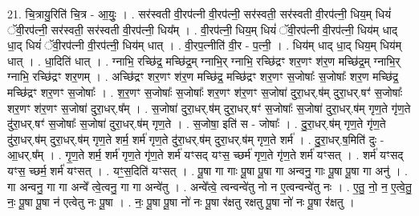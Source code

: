 \documentclass[17pt]{extarticle}
\begin{document}
21. चि॒त्रायु॒रिति॑ चि॒त्र - आ॒युः॒ । . सर॑स्वती वी॒रप॑त्नी वी॒रप॑त्नी॒ सर॑स्वती॒ सर॑स्वती वी॒रप॑त्नी॒ धिय॒म् धियं॑ ॅवी॒रप॑त्नी॒ सर॑स्वती॒ सर॑स्वती वी॒रप॑त्नी॒ धिय᳚म् । . वी॒रप॑त्नी॒ धिय॒म् धियं॑ ॅवी॒रप॑त्नी वी॒रप॑त्नी॒ धिय॑म् धाद् धा॒द् धियं॑ ॅवी॒रप॑त्नी वी॒रप॑त्नी॒ धिय॑म् धात् । . वी॒रप॒त्नीति॑ वी॒र - प॒त्नी॒ । . धिय॑म् धाद् धा॒द् धिय॒म् धिय॑म् धात् । . धा॒दिति॑ धात् । . ग्नाभि॒ रच्छि॑द्र॒ मच्छि॑द्र॒म् ग्नाभि॒र् ग्नाभि॒ रच्छि॑द्रꣳ शर॒णꣳ श॑र॒ण मच्छि॑द्र॒म् ग्नाभि॒र् ग्नाभि॒ रच्छि॑द्रꣳ शर॒णम् । . अच्छि॑द्रꣳ शर॒णꣳ श॑र॒ण मच्छि॑द्र॒ मच्छि॑द्रꣳ शर॒णꣳ स॒जोषाः᳚ स॒जोषाः᳚ शर॒ण मच्छि॑द्र॒ मच्छि॑द्रꣳ शर॒णꣳ स॒जोषाः᳚ । . श॒र॒णꣳ स॒जोषाः᳚ स॒जोषाः᳚ शर॒णꣳ श॑र॒णꣳ स॒जोषा॑ दुरा॒धर्.ष॑म् दुरा॒धर्.षꣳ॑ स॒जोषाः᳚ शर॒णꣳ श॑र॒णꣳ स॒जोषा॑ दुरा॒धर्.ष᳚म् । . स॒जोषा॑ दुरा॒धर्.ष॑म् दुरा॒धर्.षꣳ॑ स॒जोषाः᳚ स॒जोषा॑ दुरा॒धर्.ष॑म् गृण॒ते गृ॑ण॒ते दु॑रा॒धर्.षꣳ॑ स॒जोषाः᳚ स॒जोषा॑ दुरा॒धर्.ष॑म् गृण॒ते । . स॒जोषा॒ इति॑ स - जोषाः᳚ । . दु॒रा॒धर्.ष॑म् गृण॒ते गृ॑ण॒ते दु॑रा॒धर्.ष॑म् दुरा॒धर्.ष॑म् गृण॒ते शर्म॒ शर्म॑ गृण॒ते दु॑रा॒धर्.ष॑म् दुरा॒धर्.ष॑म् गृण॒ते शर्म॑ । . दु॒रा॒धर्.ष॒मिति॑ दुः - आ॒धर्.ष᳚म् । . गृ॒ण॒ते शर्म॒ शर्म॑ गृण॒ते गृ॑ण॒ते शर्म॑ यꣳसद् यꣳस॒ च्छर्म॑ गृण॒ते गृ॑ण॒ते शर्म॑ यꣳसत् । . शर्म॑ यꣳसद् यꣳस॒ च्छर्म॒ शर्म॑ यꣳसत् । . यꣳ॒॒स॒दिति॑ यꣳसत् । . पू॒षा गा गाः पू॒षा पू॒षा गा अन्वनु॒ गाः पू॒षा पू॒षा गा अनु॑ । . गा अन्वनु॒ गा गा अन्वे᳚ त्वे॒त्वनु॒ गा गा अन्वे॑तु । . अन्वे᳚त्वे॒ त्वन्वन्वे॑तु नो न ए॒त्वन्वन्वे॑तु नः । . ए॒तु॒ नो॒ न॒ ए॒त्वे॒तु॒ नः॒ पू॒षा पू॒षा न॑ एत्वेतु नः पू॒षा । . नः॒ पू॒षा पू॒षा नो॑ नः पू॒षा र॑क्षतु रक्षतु पू॒षा नो॑ नः पू॒षा र॑क्षतु । \newline
\end{document}
